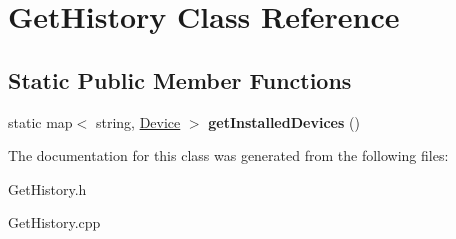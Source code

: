 \hypertarget{classGetHistory}{}\section{Get\+History Class Reference}
\label{classGetHistory}
\subsection*{Static Public Member Functions}
\begin{DoxyCompactItemize}
\item 
\mbox{\label{classGetHistory_acbfb517d46d7a80ffb59386c82745924}} 
static map$<$ string, \hyperlink{classDevice}{Device} $>$ {\bfseries get\+Installed\+Devices} ()
\end{DoxyCompactItemize}


The documentation for this class was generated from the following files\+:\begin{DoxyCompactItemize}
\item 
Get\+History.\+h\item 
Get\+History.\+cpp\end{DoxyCompactItemize}
